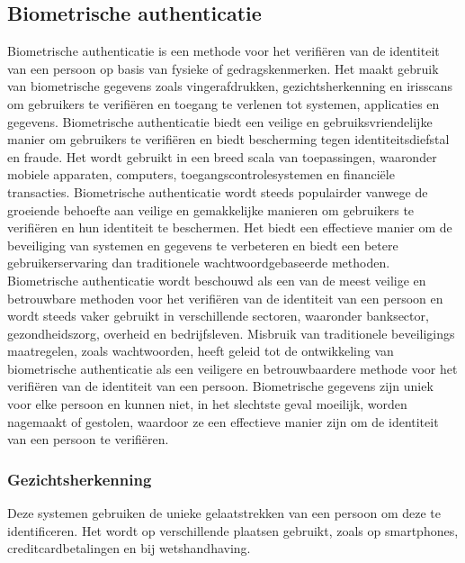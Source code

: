   \subsection{Biometrische authenticatie}%
  \label{subsec:biometrische-authenticatie}
  Biometrische authenticatie is een methode voor het verifiëren van de identiteit van een persoon op basis van fysieke of gedragskenmerken. Het maakt gebruik van biometrische gegevens zoals vingerafdrukken, gezichtsherkenning en irisscans om gebruikers te verifiëren en toegang te verlenen tot systemen, applicaties en gegevens. Biometrische authenticatie biedt een veilige en gebruiksvriendelijke manier om gebruikers te verifiëren en biedt bescherming tegen identiteitsdiefstal en fraude. Het wordt gebruikt in een breed scala van toepassingen, waaronder mobiele apparaten, computers, toegangscontrolesystemen en financiële transacties. Biometrische authenticatie wordt steeds populairder vanwege de groeiende behoefte aan veilige en gemakkelijke manieren om gebruikers te verifiëren en hun identiteit te beschermen. Het biedt een effectieve manier om de beveiliging van systemen en gegevens te verbeteren en biedt een betere gebruikerservaring dan traditionele wachtwoordgebaseerde methoden. Biometrische authenticatie wordt beschouwd als een van de meest veilige en betrouwbare methoden voor het verifiëren van de identiteit van een persoon en wordt steeds vaker gebruikt in verschillende sectoren, waaronder banksector, gezondheidszorg, overheid en bedrijfsleven.
  \newline
  \newline
  Misbruik van traditionele beveiligings maatregelen, zoals wachtwoorden, heeft geleid tot de ontwikkeling van biometrische authenticatie als een veiligere en betrouwbaardere methode voor het verifiëren van de identiteit van een persoon. Biometrische gegevens zijn uniek voor elke persoon en kunnen niet, in het slechtste geval moeilijk, worden nagemaakt of gestolen, waardoor ze een effectieve manier zijn om de identiteit van een persoon te verifiëren.
  
  \subsubsection{Gezichtsherkenning}%
  \label{subsubsec:gezichtsherkenning}
  Deze systemen gebruiken de unieke gelaatstrekken van een persoon om deze te identificeren. Het wordt op verschillende plaatsen gebruikt, zoals op smartphones, creditcardbetalingen en bij wetshandhaving.
  
